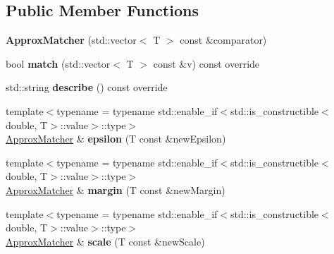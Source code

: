 \subsection*{Public Member Functions}
\begin{DoxyCompactItemize}
\item 
\mbox{\label{structCatch_1_1Matchers_1_1Vector_1_1ApproxMatcher_a55e8f7018104e0730eef656a61646870}} 
{\bfseries Approx\+Matcher} (std\+::vector$<$ T $>$ const \&comparator)
\item 
\mbox{\label{structCatch_1_1Matchers_1_1Vector_1_1ApproxMatcher_a9cbd62093c4c123f1984726e1a14b270}} 
bool {\bfseries match} (std\+::vector$<$ T $>$ const \&v) const override
\item 
\mbox{\label{structCatch_1_1Matchers_1_1Vector_1_1ApproxMatcher_a1a9237e24c513c1448fa0624b3e14232}} 
std\+::string {\bfseries describe} () const override
\item 
\mbox{\label{structCatch_1_1Matchers_1_1Vector_1_1ApproxMatcher_a319b3a7fa9d0f401bfda5b45dafbbf5a}} 
{\footnotesize template$<$typename  = typename std\+::enable\+\_\+if$<$std\+::is\+\_\+constructible$<$double, T$>$\+::value$>$\+::type$>$ }\\\mbox{\hyperlink{structCatch_1_1Matchers_1_1Vector_1_1ApproxMatcher}{Approx\+Matcher}} \& {\bfseries epsilon} (T const \&new\+Epsilon)
\item 
\mbox{\label{structCatch_1_1Matchers_1_1Vector_1_1ApproxMatcher_ac3b3afb3e5a9ad9ee0516e0202e08959}} 
{\footnotesize template$<$typename  = typename std\+::enable\+\_\+if$<$std\+::is\+\_\+constructible$<$double, T$>$\+::value$>$\+::type$>$ }\\\mbox{\hyperlink{structCatch_1_1Matchers_1_1Vector_1_1ApproxMatcher}{Approx\+Matcher}} \& {\bfseries margin} (T const \&new\+Margin)
\item 
\mbox{\label{structCatch_1_1Matchers_1_1Vector_1_1ApproxMatcher_a8658dc0564e0f80f101e4574830a3b18}} 
{\footnotesize template$<$typename  = typename std\+::enable\+\_\+if$<$std\+::is\+\_\+constructible$<$double, T$>$\+::value$>$\+::type$>$ }\\\mbox{\hyperlink{structCatch_1_1Matchers_1_1Vector_1_1ApproxMatcher}{Approx\+Matcher}} \& {\bfseries scale} (T const \&new\+Scale)
\end{DoxyCompactItemize}
